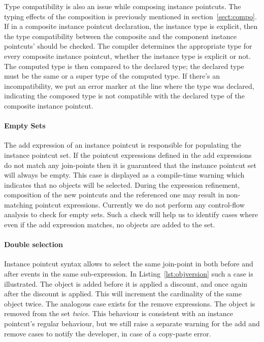 Type compatibility is also an issue while composing instance pointcuts. The typing effects of the composition is previously mentioned in section~\ref{sect:compo}. If in a composite instance pointcut declaration, the instance type is explicit, then the type compatibility between the composite and the component instance pointcuts' should be checked. The compiler determines the appropriate type for every composite instance pointcut, whether the instance type is explicit or not. The computed type is then compared to the declared type; the declared type must be the same or a super type of the computed type. If there's an incompatibility, we put an error marker at the line where the type was declared, indicating the composed type is not compatible with the declared type of the composite instance pointcut.


\paragraph*{Empty Sets} The add expression of an instance pointcut is responsible for populating the instance pointcut set. If the pointcut expressions defined in the add expressions do not match any join-points then it is guaranteed that the instance pointcut set will always be empty. This case is displayed as a compile-time warning which indicates that no objects will be selected. During the expression refinement, composition of the new pointcuts and the referenced one may result in non-matching pointcut expressions.
Currently we do not perform any control-flow analysis to check for empty sets. Such a check will help us to identify cases where even if the add expression matches, no objects are added to the set.

\paragraph*{Double selection} Instance pointcut syntax allows to select the same join-point in both before and after events in the same sub-expression. In Listing~\ref{lst:objversion} such a case is illustrated. The  object is added before it is applied a discount, and once again after the discount is applied. This will increment the cardinality of the same object twice. The analogous case exists for the remove expressions. The object is removed from the set \emph{twice}. This behaviour is consistent with an instance pointcut's regular behaviour, but we still raise a separate warning for the add and remove cases to notify the developer, in case of a copy-paste error.

